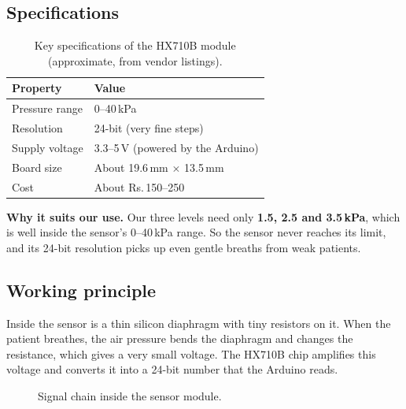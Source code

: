 \documentclass[12pt,a4paper]{article}
\newcommand{\rupee}{Rs.\,}              %
\begin{document}
\subsection{Specifications}

\begin{table}[H]
\centering
\caption{Key specifications of the HX710B module (approximate, from vendor listings).}
\label{tab:sensorspec}
\small
\begin{tabularx}{0.85\linewidth}{@{}P{4.0cm} L@{}}
\toprule
\textbf{Property} & \textbf{Value} \\
\midrule
Pressure range  & 0--40\,kPa \\
Resolution      & 24-bit (very fine steps) \\
Supply voltage  & 3.3--5\,V (powered by the Arduino) \\
Board size      & About 19.6\,mm $\times$ 13.5\,mm \\
Cost            & About \rupee 150--250 \\
\bottomrule
\end{tabularx}
\end{table}

\textbf{Why it suits our use.} Our three levels need only \textbf{1.5, 2.5 and 3.5\,kPa}, which is well inside the sensor's 0--40\,kPa range. So the sensor never reaches its limit, and its 24-bit resolution picks up even gentle breaths from weak patients.

\subsection{Working principle}
\label{sec:sensor-principle}
Inside the sensor is a thin silicon diaphragm with tiny resistors on it. When the patient breathes, the air pressure bends the diaphragm and changes the resistance, which gives a very small voltage. The HX710B chip amplifies this voltage and converts it into a 24-bit number that the Arduino reads.

\begin{figure}[H]
\centering
{}
\caption{Signal chain inside the sensor module.}
\label{fig:sensorchain}
\end{figure}
\end{document}
